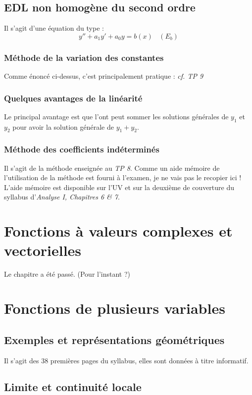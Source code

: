 \documentclass	[11pt, a4paper, openany]{book}
\begin{document}
\section{EDL non homogène du second ordre}
Il s'agit d'une équation du type : 
$$y'' + a_1y' + a_0y = b(x)\ \ \ \  (E_b)$$

\subsection{Méthode de la variation des constantes}
Comme énoncé ci-dessus, c'est principalement pratique : \textit{cf. TP 9}

\subsection{Quelques avantages de la linéarité}
Le principal avantage est que l'ont peut sommer les solutions générales de $y_1$ et $y_2$ pour avoir la solution générale de $y_1 + y_2$.

\subsection{Méthode des coefficients indéterminés}
Il s'agit de la méthode enseignée au \textit{TP 8}. Comme un aide mémoire de l'utilisation de la méthode est fourni à l'examen, je ne vais pas le recopier ici ! \\
L'aide mémoire est disponible sur l'UV et sur la deuxième de couverture du syllabus d'\textit{Analyse I, Chapitres 6 \& 7}.

\chapter{Fonctions à valeurs complexes et vectorielles}
Le chapitre a été passé. (Pour l'instant ?)

\chapter{Fonctions de plusieurs variables}
\section{Exemples et représentations géométriques}
Il s'agit des 38 premières pages du syllabus, elles sont données à titre informatif.

\section{Limite et continuité locale}
\end{document}
